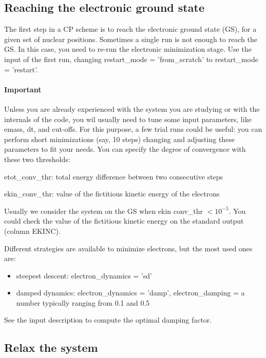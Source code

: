 \documentclass[12pt,a4paper]{article}
\begin{document}
\subsection{Reaching the electronic ground state}

The first step in a CP scheme is to reach the electronic 
ground state (GS), for a given set of nuclear positions.
Sometimes a single run is not enough to reach the GS. In this case,
you need to re-run the electronic minimization stage. Use the input 
of the first run, changing restart\_mode = 'from\_scratch' to 
restart\_mode = 'restart'.
   
\paragraph{Important} Unless you are already experienced with the system 
you are studying or with the internals of the code, you wil usually need 
to tune some input parameters, like emass, dt, and cut-offs. For this 
purpose, a few trial runs could be useful: you can perform short
minimizations (say, 10 steps) changing and adjusting these parameters 
to fit your needs. You can specify the degree of convergence with these
two thresholds:

etot\_conv\_thr: total energy difference between two consecutive steps

ekin\_conv\_thr: value of the fictitious kinetic energy of the electrons
   
Usually we consider the system on the GS when ekin conv\_thr $ < 10^{-5}$.
You could check the value of the fictitious kinetic energy on the standard 
output (column EKINC).

Different strategies are available to minimize electrons, but the most used 
ones are:
\begin{itemize}
\item steepest descent: electron\_dynamics = 'sd'
\item damped dynamics: electron\_dynamics = 'damp',
  electron\_damping = a number typically ranging from 0.1 and 0.5 
\end{itemize}
See the input description to compute the optimal damping factor.

\subsection{Relax the system}
\end{document}
